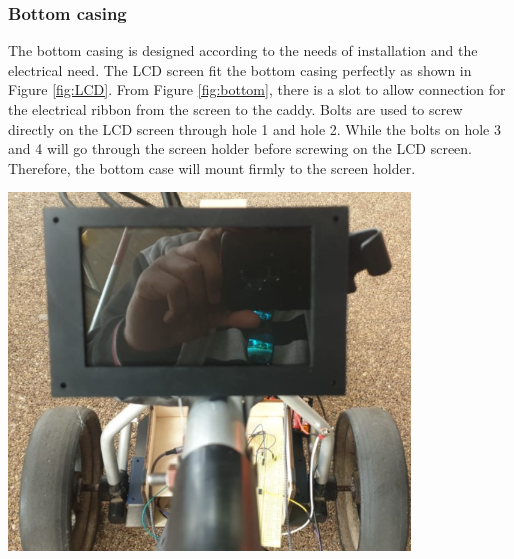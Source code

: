 \documentclass[11pt,landscape]{article}
\newenvironment{Figure}
  {\par\medskip\noindent\minipage{\linewidth}}
  {\endminipage\par\medskip}
\begin{document}
\begin{multicols}{3}
    
    \subsubsection{Bottom casing}
    The bottom casing is designed according to the needs of installation and the
    electrical need. The LCD screen fit the bottom casing perfectly as shown in
    Figure \ref{fig:LCD}. From Figure \ref{fig:bottom}, there is a slot to allow
    connection for the electrical ribbon from the screen to the caddy. Bolts are
    used to screw directly on the LCD screen through hole 1 and hole 2. While
    the bolts on hole 3 and 4 will go through the screen holder before screwing
    on the LCD screen. Therefore, the bottom case will mount firmly to the
    screen holder.
    
    \begin{Figure}
        \begin{center}
            \includegraphics[width=0.8\textwidth]{Figure32.jpg}
            \label{fig:LCD}
        \end{center}
    \end{Figure}
    

\end{multicols}
\end{document}
